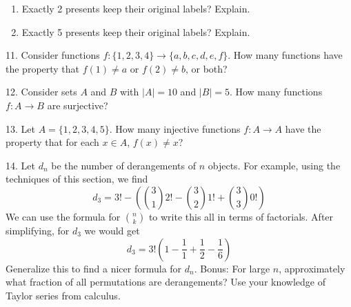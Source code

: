 \documentclass[10pt,]{book}
\theoremstyle{plain}
\theoremstyle{definition}
\numberwithin{equation}{chapter}
\begin{document}
\begin{exerciselist}
\begin{enumerate}[label=(\alph*)]
\item\hypertarget{li-364}{}
                Exactly 2 presents keep their original labels? Explain.


\item\hypertarget{li-365}{}
                Exactly 5 presents keep their original labels? Explain.


\end{enumerate}

\par\smallskip
\item[11.]\hypertarget{exercise-116}{}
      Consider functions \(f: \{1,2,3,4\} \to \{a,b,c,d,e,f\}\).
      How many functions have the property that \(f(1) \ne a\) or \(f(2) \ne b\), or both?
\par\smallskip
\item[12.]\hypertarget{exercise-117}{}
      Consider sets \(A\) and \(B\) with \(|A| = 10\) and \(|B| = 5\). How many functions \(f: A \to B\) are surjective?
\par\smallskip
\item[13.]\hypertarget{exercise-118}{}
      Let \(A = \{1,2,3,4,5\}\). How many injective functions \(f:A \to A\) have the property that for each \(x \in A\), \(f(x) \ne x\)?
\par\smallskip
\item[14.]\hypertarget{exercise-119}{}
            Let \(d_n\) be the number of derangements of \(n\) objects. For example, using the techniques of this section, we find
            \begin{equation*}
              d_3 = 3!-\left({3 \choose 1}2! - {3 \choose 2}1! + {3 \choose 3}0! \right)
            \end{equation*}
            We can use the formula for \({n \choose k}\) to write this all in terms of factorials.  After simplifying, for \(d_3\) we would get
            \begin{equation*}
              d_3 = 3!\left(1 - \frac{1}{1} + \frac{1}{2} - \frac{1}{6} \right)
            \end{equation*}
            Generalize this to find a nicer formula for \(d_n\).  Bonus: For large \(n\), approximately what fraction of all permutations are derangements?  Use your knowledge of Taylor series from calculus.
\par\smallskip
\end{exerciselist}
\typeout{************************************************}
\typeout{************************************************}
\end{document}
